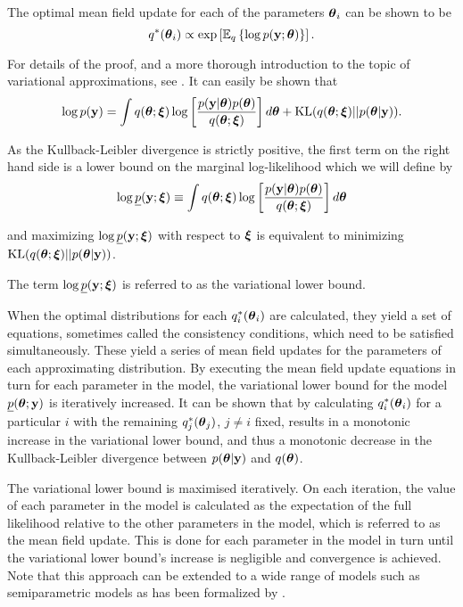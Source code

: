 The optimal mean field update for each of the parameters ${\boldsymbol \theta}_i$ can be
shown to be
$$
	q^*({\boldsymbol \theta}_i) \propto \exp\left[ \mathbb{E}_q \left\{ \log p({\bf y}; {\boldsymbol \theta})\right\} \right].
$$

\noindent For details of the proof, and a more thorough introduction to the
topic of variational approximations, see \cite{Ormerod2010}. It can easily be
shown that
$$
	\displaystyle \log p({\bf y}) = \int q({\boldsymbol \theta};{\boldsymbol \xi}) \log \left[ \frac{p({\bf y}|{\boldsymbol \theta})p({\boldsymbol \theta})}{q({\boldsymbol \theta};{\boldsymbol \xi})} \right] d{\boldsymbol \theta} + \text{KL}(q({\boldsymbol \theta};{\boldsymbol \xi})||p({\boldsymbol \theta}|{\bf y})).
$$

\noindent As the Kullback-Leibler divergence is strictly positive, the first
term on the right hand side is a lower bound on the marginal log-likelihood
which we will define by
$$
	\displaystyle \log \underline{p}({\bf y};{\boldsymbol \xi}) \equiv \int q({\boldsymbol \theta};{\boldsymbol \xi})  \log \left[ \frac{p({\bf y}|{\boldsymbol \theta})p({\boldsymbol \theta})}{q({\boldsymbol \theta};{\boldsymbol \xi})} \right] d{\boldsymbol \theta}
$$

\noindent and maximizing $\log \underline{p}({\bf y};{\boldsymbol \xi})$ with respect to ${\boldsymbol \xi}$
is equivalent to minimizing $\text{KL}(q({\boldsymbol \theta};{\boldsymbol \xi})||p({\boldsymbol \theta}|{\bf y}))$.

\noindent  The term $\log
\underline{p}({\bf y};{\boldsymbol \xi})$ is referred to as the variational lower bound.

When the optimal distributions for each $q_i^*({\boldsymbol \theta}_i)$ are calculated, they
yield a set of equations, sometimes called the consistency conditions, which
need to be  satisfied simultaneously. These yield a series of mean field updates
for the parameters of each approximating distribution. By executing the mean
field update equations in turn for each parameter in the model, the variational
lower bound for the model $\underline{p}({\boldsymbol \theta}; {\bf y})$ is iteratively
increased. It can be shown that by calculating $q_i^*({\boldsymbol \theta}_i)$ for  a
particular $i$ with the remaining $q_j^*({\boldsymbol \theta}_j)$, $j\ne i$ fixed, results in
a monotonic increase in the variational lower bound, and thus a monotonic
decrease in the Kullback-Leibler divergence between $p({\boldsymbol \theta}|{\bf y})$ and
$q({\boldsymbol \theta})$.

The variational lower bound is maximised iteratively. On each iteration, the
value of each parameter in the model is calculated as the expectation of the
full likelihood relative to the other parameters in the model, which is
referred to as the mean field update. This is done for each parameter in the
model in turn until the variational lower bound's increase is negligible and
convergence is achieved. Note that this approach can be extended to a wide
range of models such as semiparametric models as has been formalized by
\cite{Rohde2015}.

